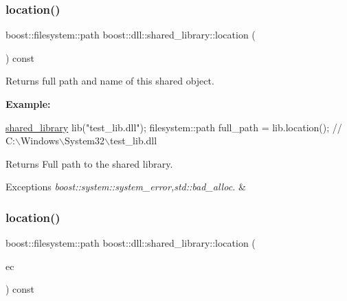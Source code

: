 \subsubsection{\texorpdfstring{location()}{location()}\hspace{0.1cm}{\footnotesize\ttfamily [1/2]}}
{\footnotesize\ttfamily boost\+::filesystem\+::path boost\+::dll\+::shared\+\_\+library\+::location (\begin{DoxyParamCaption}{ }\end{DoxyParamCaption}) const\hspace{0.3cm}{\ttfamily [inline]}}

Returns full path and name of this shared object.

{\bfseries Example\+:} 
\begin{DoxyCode}
\hyperlink{a01708_a2ebb56c35c652538adac15f9e7042bc3}{shared\_library} lib(\textcolor{stringliteral}{"test\_lib.dll"});
filesystem::path full\_path = lib.location(); \textcolor{comment}{// C:\(\backslash\)Windows\(\backslash\)System32\(\backslash\)test\_lib.dll}
\end{DoxyCode}


\begin{DoxyReturn}{Returns}
Full path to the shared library. 
\end{DoxyReturn}

\begin{DoxyExceptions}{Exceptions}
{\em boost\+::system\+::system\+\_\+error,std\+::bad\+\_\+alloc.} & \\
\hline
\end{DoxyExceptions}
\mbox{\label{a01708_adc304efe269b41dd87a835bdc94feb40}} 
\subsubsection{\texorpdfstring{location()}{location()}\hspace{0.1cm}{\footnotesize\ttfamily [2/2]}}
{\footnotesize\ttfamily boost\+::filesystem\+::path boost\+::dll\+::shared\+\_\+library\+::location (\begin{DoxyParamCaption}\item[{boost\+::system\+::error\+\_\+code \&}]{ec }\end{DoxyParamCaption}) const\hspace{0.3cm}{\ttfamily [inline]}}

